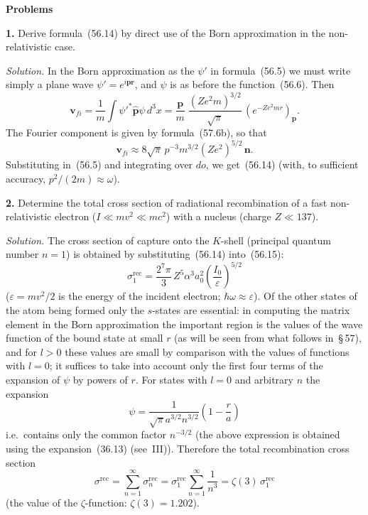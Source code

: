 \bigskip
\begin{center}\textbf{Problems}\end{center}
\smallskip
\textbf{1.} Derive formula~(56.14) by direct use of the Born approximation in the non-relativistic case.

\textit{Solution.} In the Born approximation as the $\psi'$ in formula~(56.5) we must write simply a plane wave $\psi' = e^{i\mathbf{p}\mathbf{r}}$, and $\psi$ is as before the function~(56.6). Then
\[
\mathbf{v}_{fi} = \frac{1}{m}\int\psi'^*\widehat{\mathbf{p}}\psi\,d^3x = \frac{\mathbf{p}}{m}\;\frac{(Ze^2m)^{3/2}}{\sqrt{\pi}}\,(e^{-Ze^2mr})_\mathbf{p}.
\]
The Fourier component is given by formula~(57.6b), so that
\[
\mathbf{v}_{fi} \approx 8\sqrt{\pi}\,p^{-3}m^{3/2}(Ze^2)^{5/2}\,\mathbf{n}.
\]
Substituting in~(56.5) and integrating over $do$, we get~(56.14) (with, to sufficient accuracy, $p^2/(2m) \approx \omega$).

\textbf{2.} Determine the total cross section of radiational recombination of a fast non-relativistic electron ($I \ll mv^2 \ll mc^2$) with a nucleus (charge $Z \ll 137$).

\textit{Solution.} The cross section of capture onto the $K$-shell (principal quantum number $n = 1$) is obtained by substituting~(56.14) into~(56.15):
\[
\sigma^\mathrm{rec}_1 = \frac{2^7\pi}{3}\,Z^5\alpha^3 a^2_0\left(\frac{I_0}{\varepsilon}\right)^{\!5/2}
\]
($\varepsilon = mv^2/2$ is the energy of the incident electron; $\hbar\omega \approx \varepsilon$). Of the other states of the atom being formed only the $s$-states are essential: in computing the matrix element in the Born approximation the important region is the values of the wave function of the bound state at small $r$ (as will be seen from what follows in~\S\,57), and for $l > 0$ these values are small by comparison with the values of functions with $l = 0$; it suffices to take into account only the first four terms of the expansion of $\psi$ by powers of $r$. For states with $l = 0$ and arbitrary $n$ the expansion
\[
\psi = \frac{1}{\sqrt{\pi}a^{3/2}n^{3/2}}\left(1 - \frac{r}{a}\right)
\]
i.e.\ contains only the common factor $n^{-3/2}$ (the above expression is obtained using the expansion~(36.13) (see~III)). Therefore the total recombination cross section
\[
\sigma^\mathrm{rec} = \sum_{n=1}^{\infty}\sigma^\mathrm{rec}_n = \sigma^\mathrm{rec}_1\sum_{n=1}^{\infty}\frac{1}{n^3} = \zeta(3)\,\sigma^\mathrm{rec}_1
\]
(the value of the $\zeta$-function: $\zeta(3) = 1.202$).
